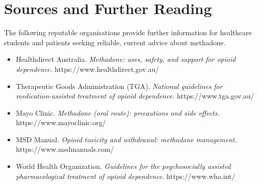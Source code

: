 \section*{Sources and Further Reading}
The following reputable organisations provide further information for healthcare students and patients seeking reliable, current advice about methadone.

\begin{itemize}
    \item Healthdirect Australia. \textit{Methadone: uses, safety, and support for opioid dependence.} https://www.healthdirect.gov.au/
    \item Therapeutic Goods Administration (TGA). \textit{National guidelines for medication-assisted treatment of opioid dependence.} https://www.tga.gov.au/
    \item Mayo Clinic. \textit{Methadone (oral route): precautions and side effects.} https://www.mayoclinic.org/
    \item MSD Manual. \textit{Opioid toxicity and withdrawal: methadone management.} https://www.msdmanuals.com/
    \item World Health Organization. \textit{Guidelines for the psychosocially assisted pharmacological treatment of opioid dependence.} https://www.who.int/
\end{itemize}
